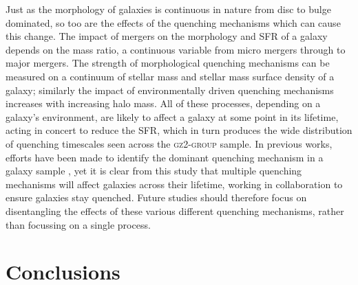 \documentclass[useAMS,usenatbib]{mn2e}
\begin{document}
Just as the morphology of galaxies is continuous in nature from disc to bulge dominated, so too are the effects of the quenching mechanisms which can cause this change. The impact of mergers on the morphology and SFR of a galaxy depends on the mass ratio, a continuous variable from micro mergers \citep{carlin16} through to major mergers. The strength of morphological quenching mechanisms can be measured on a continuum of stellar mass and stellar mass surface density of a galaxy; similarly the impact of environmentally driven quenching mechanisms increases with increasing halo mass. All of these processes, depending on a galaxy's environment, are likely to affect a galaxy at some point in its lifetime, acting in concert to reduce the SFR, which in turn produces the wide distribution of quenching timescales seen across the \textsc{gz2-group} sample. In previous works, efforts have been made to identify the dominant quenching mechanism in a galaxy sample \citep[e.g.][]{muzzin12, schawinski14, foltz15, woo15, balogh16, darvish16, huertascompany16}, yet it is clear from this study that multiple quenching mechanisms will affect galaxies across their lifetime, working in collaboration to ensure galaxies stay quenched. Future studies should therefore focus on disentangling the effects of these various different quenching mechanisms, rather than focussing on a single process. 

\section{Conclusions}\label{sec:conc}
\end{document}
